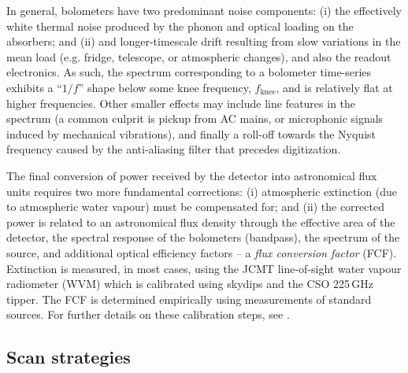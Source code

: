 \documentclass[useAMS,usenatbib,nofootinbib]{mn2e}
\begin{document}


In general, bolometers have two predominant noise components: (i) the
effectively white thermal noise produced by the phonon and optical
loading on the absorbers; and (ii) and longer-timescale drift
resulting from slow variations in the mean load (e.g. fridge,
telescope, or atmospheric changes), and also the readout
electronics. As such, the spectrum corresponding to a bolometer
time-series exhibits a ``$1/f$'' shape below some knee frequency,
$f_\mathrm{knee}$, and is relatively flat at higher frequencies. Other
smaller effects may include line features in the spectrum (a common
culprit is pickup from AC mains, or microphonic signals induced by
mechanical vibrations), and finally a roll-off towards the Nyquist
frequency caused by the anti-aliasing filter that precedes
digitization.

The final conversion of power received by the detector into
astronomical flux units requires two more fundamental corrections: (i)
atmospheric extinction (due to atmospheric water vapour) must be
compensated for; and (ii) the corrected power is related to an
astronomical flux density through the effective area of the detector,
the spectral response of the bolometers (bandpass), the spectrum of
the source, and additional optical efficiency factors -- a \emph{flux
  conversion factor} (FCF). Extinction is measured, in most cases,
using the JCMT line-of-sight water vapour radiometer (WVM) which is
calibrated using skydips and the CSO 225\,GHz tipper. The FCF is
determined empirically using measurements of standard sources. For
further details on these calibration steps, see \citet{dempsey2012}.

\subsection{Scan strategies}
\label{sec:scan}
\end{document}
